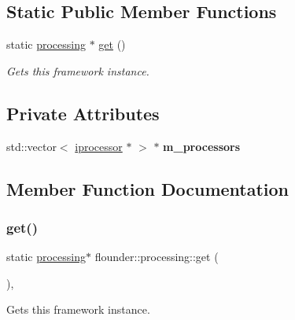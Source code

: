 \subsection*{Static Public Member Functions}
\begin{DoxyCompactItemize}
\item 
static \hyperlink{classflounder_1_1processing}{processing} $\ast$ \hyperlink{classflounder_1_1processing_a9d533a541a2a514d201ff2c37782d44d}{get} ()
\begin{DoxyCompactList}\small\item\em Gets this framework instance. \end{DoxyCompactList}\end{DoxyCompactItemize}
\subsection*{Private Attributes}
\begin{DoxyCompactItemize}
\item 
\mbox{\label{classflounder_1_1processing_a77870c9b9e04569dc459767d11c47da5}} 
std\+::vector$<$ \hyperlink{classflounder_1_1iprocessor}{iprocessor} $\ast$ $>$ $\ast$ {\bfseries m\+\_\+processors}
\end{DoxyCompactItemize}


\subsection{Member Function Documentation}
\mbox{\label{classflounder_1_1processing_a9d533a541a2a514d201ff2c37782d44d}} 
\subsubsection{\texorpdfstring{get()}{get()}}
{\footnotesize\ttfamily static \hyperlink{classflounder_1_1processing}{processing}$\ast$ flounder\+::processing\+::get (\begin{DoxyParamCaption}{ }\end{DoxyParamCaption})\hspace{0.3cm}{\ttfamily [inline]}, {\ttfamily [static]}}



Gets this framework instance. 

